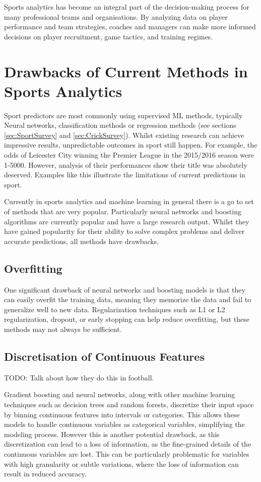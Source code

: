 \documentclass[12pt,a4paper]{report}
\theoremstyle{definition}
\begin{document}
Sports analytics has become an integral part of the decision-making process for many professional teams and organisations. 
By analyzing data on player performance and team strategies, coaches and managers can make more informed decisions on player recruitment, game tactics, and training regimes.

\section{Drawbacks of Current Methods in Sports Analytics}

Sport predictors are most commonly using supervised ML methods, typically Neural networks, classification methods or regression methods \citep{horvat2020} (see sections \ref{sec:SportSurvey} and \ref{sec:CrickSurvey}). 
Whilst existing research can achieve impressive results, unpredictable outcomes in sport still happen. For example, the odds of Leicester City winning the Premier League in the 2015/2016 season were 1-5000. 
However, analysis of their performances show their title was absolutely deserved.
Examples like this illustrate the limitations of current predictions in sport.

Currently in sports analytics and machine learning in general there is a go to set of methods that are very popular.
Particularly neural networks and boosting algorithms are currently popular and have a large research output.
Whilst they have gained popularity for their ability to solve complex problems and deliver accurate predictions, all methods have drawbacks.

\subsection{Overfitting}

One significant drawback of neural networks and boosting models is that they can easily overfit the training data, meaning they memorize the data and fail to generalize well to new data. 
Regularization techniques such as L1 or L2 regularization, dropout, or early stopping can help reduce overfitting, but these methods may not always be sufficient.

\subsection{Discretisation of Continuous Features}

TODO:  Talk about how they do this in football.

Gradient boosting and neural networks, along with other machine learning techniques such as decision trees and random forests, discretize their input space by binning continuous features into intervals or categories. 
This allows these models to handle continuous variables as categorical variables, simplifying the modeling process. 
However this is another potential drawback, as this discretization can lead to a loss of information, as the fine-grained details of the continuous variables are lost. 
This can be particularly problematic for variables with high granularity or subtle variations, where the loss of information can result in reduced accuracy.
\end{document}
